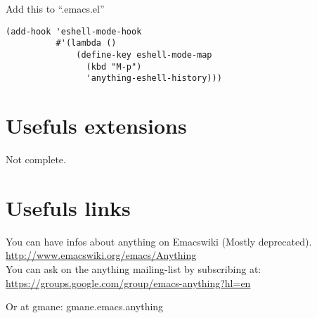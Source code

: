 \documentclass[a4paper,11pt]{article}
\newenvironment{encadre}{%
  \begin{lrbox}{\boiteencadre}%
  \begin{minipage}{.8\textwidth}}{%
  \end{minipage}
  \end{lrbox}%
  \begin{center}
    \fbox{\usebox{\boiteencadre}}
  \end{center}}
\begin{document}
Add this to ``.emacs.el''
\begin{encadre}
\begin{verbatim}
(add-hook 'eshell-mode-hook
          #'(lambda ()
              (define-key eshell-mode-map 
                (kbd "M-p")
                'anything-eshell-history)))
\end{verbatim}
\end{encadre}

\section{Usefuls extensions}
\label{sec:usefuls-extensions}
Not complete.

\section{Usefuls links}
\label{sec:usefuls-links}

You can have infos about anything on Emacswiki (Mostly deprecated).\\
\url{http://www.emacswiki.org/emacs/Anything}\\

You can ask on the anything mailing-list by subscribing at:\\
\url{https://groups.google.com/group/emacs-anything?hl=en}

Or at gmane: gmane.emacs.anything
\end{document}
